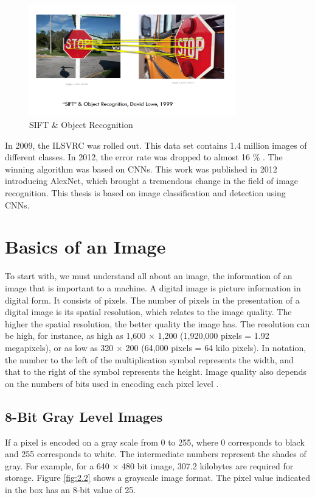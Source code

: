 \begin{figure}[t]
	\centering
	\includegraphics[width=0.80\textwidth]{CHAPTERS/Chapter-2/Images/2.1.png}
	\caption{SIFT \& Object Recognition}
	\label{fig:2.1}
\end{figure}
In 2009, the ILSVRC was 
rolled out. This data set contains 1.4 million images of different classes. In 2012, the 
error rate was dropped to almost 16 \% \cite{chap_2_article:5}. The winning algorithm was based on 
CNNs. This work was published in 2012 introducing AlexNet, which brought a tremendous change in the field of image recognition. This thesis is based on image 
classification and detection using CNNs. 

\section{Basics of an Image}
To start with, we must understand all about an image, the information of 
an image that is important to a machine. A digital image is picture 
information in digital form. It consists of pixels. The number of pixels 
in the presentation of a digital image is its spatial resolution, which 
relates to the image quality. The higher the spatial resolution, the better 
quality the image has. The resolution can be high, for instance, as high as 
1,600 $\times$ 1,200 (1,920,000 pixels = 1.92 megapixels), or as 
low as 320 $\times$ 200 (64,000 pixels = 64 kilo pixels). In notation, the number 
to the left of the multiplication symbol represents the width, and that to 
the right of the symbol represents the height. Image quality also depends on 
the numbers of bits used in encoding each pixel level \cite{chap_2_article:6,chap_2_article:7}. 

\subsection{8-Bit Gray Level Images}
If a pixel is encoded on a gray scale from 0 to 255, where 
0 corresponds to black and 255 corresponds to white. The intermediate 
numbers represent the shades of gray. For example, for a 640 $\times$ 480 bit 
image, 307.2 kilobytes are required for storage. Figure \ref{fig:2.2} shows a 
grayscale image format. The pixel value indicated 
in the box has an 8-bit value of 25. 

